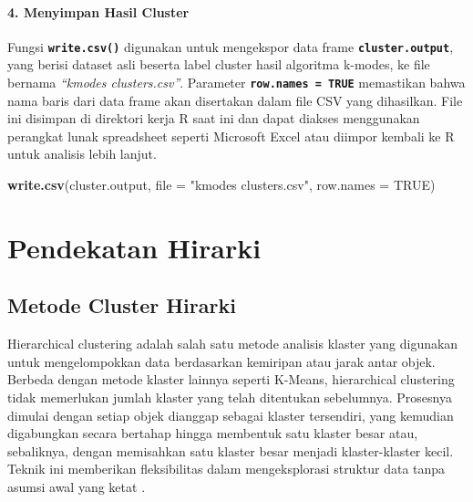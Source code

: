 \documentclass[
  oneside]{book}
\newenvironment{Shaded}{\begin{snugshade}}{\end{snugshade}}
\newcommand{\AttributeTok}[1]{\textcolor[rgb]{0.13,0.29,0.53}{#1}}
\newcommand{\ConstantTok}[1]{\textcolor[rgb]{0.56,0.35,0.01}{#1}}
\newcommand{\DecValTok}[1]{\textcolor[rgb]{0.00,0.00,0.81}{#1}}
\newcommand{\FunctionTok}[1]{\textcolor[rgb]{0.13,0.29,0.53}{\textbf{#1}}}
\newcommand{\NormalTok}[1]{#1}
\newcommand{\OtherTok}[1]{\textcolor[rgb]{0.56,0.35,0.01}{#1}}
\newcommand{\SpecialCharTok}[1]{\textcolor[rgb]{0.81,0.36,0.00}{\textbf{#1}}}
\newcommand{\StringTok}[1]{\textcolor[rgb]{0.31,0.60,0.02}{#1}}
\begin{document}
\begin{Shaded}
\end{Shaded}

\subsection*{4. Menyimpan Hasil Cluster}\label{menyimpan-hasil-cluster}

Fungsi \textbf{\texttt{write.csv()}} digunakan untuk mengekspor data frame \textbf{\texttt{cluster.output}}, yang berisi dataset asli beserta label cluster hasil algoritma k-modes, ke file bernama \emph{``kmodes clusters.csv''}. Parameter \textbf{\texttt{row.names\ =\ TRUE}} memastikan bahwa nama baris dari data frame akan disertakan dalam file CSV yang dihasilkan. File ini disimpan di direktori kerja R saat ini dan dapat diakses menggunakan perangkat lunak spreadsheet seperti Microsoft Excel atau diimpor kembali ke R untuk analisis lebih lanjut.

\begin{Shaded}
\begin{Highlighting}[]
\FunctionTok{write.csv}\NormalTok{(cluster.output, }\AttributeTok{file =} \StringTok{"kmodes clusters.csv"}\NormalTok{, }\AttributeTok{row.names =} \ConstantTok{TRUE}\NormalTok{)}
\end{Highlighting}
\end{Shaded}

\part{Pendekatan Hirarki}\label{part-pendekatan-hirarki}

\chapter{Metode Cluster Hirarki}\label{HC}

Hierarchical clustering adalah salah satu metode analisis klaster yang digunakan untuk mengelompokkan data berdasarkan kemiripan atau jarak antar objek. Berbeda dengan metode klaster lainnya seperti K-Means, hierarchical clustering tidak memerlukan jumlah klaster yang telah ditentukan sebelumnya. Prosesnya dimulai dengan setiap objek dianggap sebagai klaster tersendiri, yang kemudian digabungkan secara bertahap hingga membentuk satu klaster besar atau, sebaliknya, dengan memisahkan satu klaster besar menjadi klaster-klaster kecil. Teknik ini memberikan fleksibilitas dalam mengeksplorasi struktur data tanpa asumsi awal yang ketat \citep{everitt2011cluster} .
\end{document}

